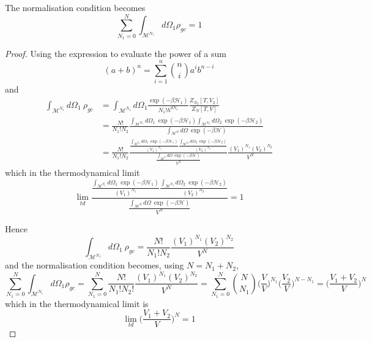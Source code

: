     The normalisation condition becomes 
    \begin{equation*}
        \sum_{N_1 = 0}^{N} \int_{\mathcal M^{N_1}} d\Omega_1 \rho_{gc} = 1
    \end{equation*}

    \begin{proof}
        Using the expression to evaluate the power of a sum 
        \begin{equation*}
            (a + b)^n = \sum_{i=1}^{n} \binom{n}{i} a^i b^{n-i} 
        \end{equation*}
        and 
        \begin{equation*}
        \begin{aligned}
            \int_{\mathcal M^{N_1}} d\Omega_1 ~ \rho_{gc} & = \int_{\mathcal M^{N_1}} d\Omega_1 \frac{\exp(-\beta \mathcal H_1)}{N_1! h^{d N_1}} \frac{Z_{N_2} [T, V_2]}{Z_N [T, V]} \\ & = \frac{N!}{N_1! N_2} \frac{\int_{\mathcal M^{N_1}} d\Omega_1 ~ \exp(-\beta \mathcal H_1) \int_{\mathcal M^{N_2}} d\Omega_2 ~ \exp(-\beta \mathcal H_2)}{\int_{\mathcal M^N} d\Omega ~ \exp(-\beta \mathcal H)} \\ & = \frac{N!}{N_1! N_2} \frac{\frac{\int_{\mathcal M^{N_1}} d\Omega_1 ~ \exp(-\beta \mathcal H_1)}{(V_1)^{N_1}} \frac{\int_{\mathcal M^{N_2}} d\Omega_2 ~ \exp(-\beta \mathcal H_2)}{(V_2)^{N_2}}}{\frac{\int_{\mathcal M^N} d\Omega ~ \exp(-\beta \mathcal H)}{V^N}} \frac{(V_1)^{N_1} (V_2)^{N_2}}{V^N} 
        \end{aligned}
        \end{equation*}
        which in the thermodynamical limit 
        \begin{equation*}
            \lim_{td} \frac{\frac{\int_{\mathcal M^{N_1}} d\Omega_1 ~ \exp(-\beta \mathcal H_1)}{(V_1)^{N_1}} \frac{\int_{\mathcal M^{N_2}} d\Omega_2 ~ \exp(-\beta \mathcal H_2)}{(V_2)^{N_2}}}{\frac{\int_{\mathcal M^N} d\Omega ~ \exp(-\beta \mathcal H)}{V^N}} = 1
        \end{equation*}

        Hence 
        \begin{equation*}
            \int_{\mathcal M^{N_1}} d\Omega_1 ~ \rho_{gc} = \frac{N!}{N_1! N_2} \frac{(V_1)^{N_1} (V_2)^{N_2}}{V^N} 
        \end{equation*}
        and the normalisation condition becomes, using $N = N_1 + N_2$, 
        \begin{equation*}
            \sum_{N_1 = 0}^{N} \int_{\mathcal M^{N_1}} d\Omega_1 \rho_{gc} = \sum_{N_1 = 0}^{N} \frac{N!}{N_1! N_2!} \frac{(V_1)^{N_1} (V_2)^{N_2}}{V^N} = \sum_{N_1 = 0}^{N} \binom{N}{N_1} \Big ( \frac{V}{V} \Big)^{N_1}  \Big ( \frac{V_2}{V} \Big)^{N - N_1} = \Big ( \frac{V_1 + V_2}{V} \Big)^N 
        \end{equation*}
        which in the thermodynamical limit is 
        \begin{equation*}
            \lim_{td} \Big ( \frac{V_1 + V_2}{V} \Big)^N  = 1
        \end{equation*}
    \end{proof}

